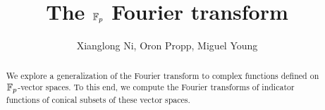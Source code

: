 \documentclass[10pt,a4paper]{amsart}
\begin{document}
	
	\title{The $\mathbb{F}_p$ Fourier transform}
	\author{Xianglong Ni, Oron Propp, Miguel Young }
	
	\maketitle
	
	\begin{abstract}
	    We explore a generalization of the Fourier transform to complex
	    functions defined on $\mathbb{F}_p$-vector spaces. To this end, we compute the Fourier
	    transforms of indicator functions of conical subsets of these vector spaces.
	\end{abstract}
	
	\tableofcontents

    
    
	
	
    
	\clearpage
	\appendix
	

    
	
\end{document}
